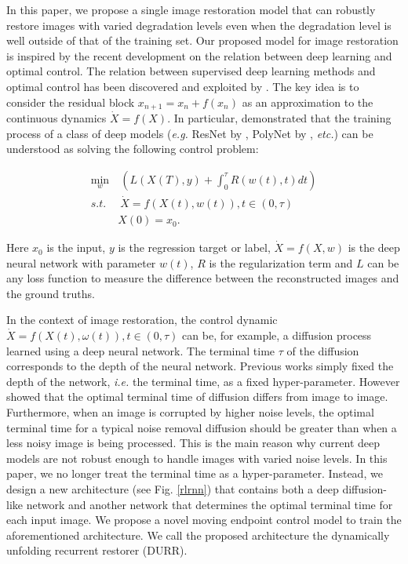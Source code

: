 \documentclass{article} %
\begin{document}
In this paper, we propose a single image restoration model that can robustly restore images with varied degradation levels even when the degradation level is well outside of that of the training set. Our proposed model for image restoration is inspired by the recent development on the relation between deep learning and optimal control. The relation between
supervised deep learning methods and optimal control
has been discovered and exploited by \cite{Weinan2017A, Lu2018Beyond,
	Chang2017Reversible,fang2017feature}. The key idea is to consider
the residual block $x_{n+1}=x_n+f(x_n)$ as an approximation to
the continuous dynamics $\dot X = f(X)$. In particular,
\cite{Lu2018Beyond,fang2017feature} demonstrated that the training process
of a class of deep models (\textit{e.g.} ResNet by \cite{he2016deep},
PolyNet by \cite{zhang2017polynet}, \textit{etc.})
can be understood as solving the following control problem:

\begin{align}
\min_w&\ \left(L(X(T),y)+ \int_{0}^{\tau} R(w(t),t)dt\right) \nonumber\\
s.t.&\  \dot{X}=f(X(t),w(t)),t\in(0,\tau) \\
& X(0)=x_0. \nonumber
\end{align}

Here $x_0$ is the input, $y$ is the regression target or label,
$\dot{X}=f(X,w)$ is the deep neural network with parameter $w(t)$, $R$ is
the regularization term and $L$ can be any loss function to measure
the difference between the reconstructed images and the ground truths.

In the context of image restoration, the control dynamic $\dot X = f(X(t),\omega(t)), t\in(0,\tau)$
can be, for example, a diffusion process learned using a deep neural network.
The terminal time $\tau$ of the diffusion corresponds to the depth of the neural network.
Previous works simply fixed the depth of the network, \textit{i.e.} the terminal time,
as a fixed hyper-parameter. However \cite{mrazek2003selection} showed that
the optimal terminal time of diffusion differs from image to image.
Furthermore, when an image is corrupted by higher noise levels,
the optimal terminal time for a typical noise removal diffusion should be
greater than when a less noisy image is being processed. This is
the main reason why current deep models are not robust enough to handle images
with varied noise levels. In this paper, we no longer treat the terminal time
as a hyper-parameter. Instead, we design a new architecture (see Fig. \ref{rlrnn})
that contains both a deep diffusion-like network and another network that determines
the optimal terminal time for each input image. We propose a novel moving endpoint control model
to train the aforementioned architecture. We call
the proposed architecture the dynamically unfolding recurrent restorer (DURR).
\end{document}
